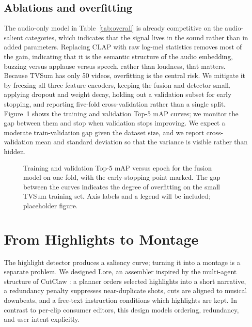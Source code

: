 \documentclass[10pt,twocolumn,letterpaper]{article}
\begin{document}
\subsection{Ablations and overfitting}
The audio-only model in Table~\ref{tab:overall} is already competitive on the audio-salient categories, which indicates that the signal lives in the sound rather than in added parameters. Replacing CLAP with raw log-mel statistics removes most of the gain, indicating that it is the semantic structure of the audio embedding, buzzing versus applause versus speech, rather than loudness, that matters. Because TVSum has only 50 videos, overfitting is the central risk. We mitigate it by freezing all three feature encoders, keeping the fusion and detector small, applying dropout and weight decay, holding out a validation subset for early stopping, and reporting five-fold cross-validation rather than a single split. Figure~\ref{fig:curve} shows the training and validation Top-5 mAP curves; we monitor the gap between them and stop when validation stops improving. We expect a moderate train-validation gap given the dataset size, and we report cross-validation mean and standard deviation so that the variance is visible rather than hidden.

\begin{figure}[t]
\begin{center}
\fbox{\rule{0pt}{1.5in} \rule{0.9\linewidth}{0pt}}
\end{center}
   \caption{Training and validation Top-5 mAP versus epoch for the fusion model on one fold, with the early-stopping point marked. The gap between the curves indicates the degree of overfitting on the small TVSum training set. Axis labels and a legend will be included; placeholder figure.}
\label{fig:curve}
\end{figure}

\section{From Highlights to Montage}

The highlight detector produces a saliency curve; turning it into a montage is a separate problem. We designed Lore, an assembler inspired by the multi-agent structure of CutClaw \cite{cutclaw}: a planner orders selected highlights into a short narrative, a redundancy penalty suppresses near-duplicate shots, cuts are aligned to musical downbeats, and a free-text instruction conditions which highlights are kept. In contrast to per-clip consumer editors, this design models ordering, redundancy, and user intent explicitly.
\end{document}
